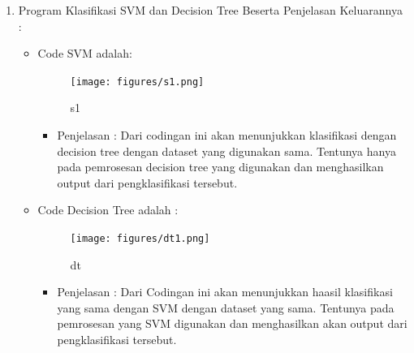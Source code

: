 \begin{enumerate}
\begin{itemize}
\end{itemize}

\par
\par
\item Program Klasifikasi SVM dan Decision Tree Beserta Penjelasan Keluarannya :
\begin{itemize}
\item Code SVM adalah:
\par
\begin{figure}[ht]
\centering
\texttt{[image: figures/s1.png]}
\caption{s1}
\label{contoh}
\end{figure}
\par
\begin{itemize}
\item Penjelasan : Dari codingan ini akan menunjukkan klasifikasi dengan decision tree dengan dataset yang digunakan sama. Tentunya hanya pada pemrosesan decision tree yang digunakan dan menghasilkan output dari pengklasifikasi tersebut.
\par 
\par
\end{itemize}
\item Code Decision Tree adalah :
\par
\begin{figure}[ht]
\centering
\texttt{[image: figures/dt1.png]}
\caption{dt}
\label{contoh}
\end{figure}
\par
\begin{itemize}
\item Penjelasan : Dari Codingan ini akan menunjukkan haasil klasifikasi yang sama  dengan SVM dengan dataset yang sama. Tentunya pada pemrosesan yang SVM digunakan dan menghasilkan akan output dari pengklasifikasi tersebut.
\par
\par
\end{itemize}
\end{itemize}




\end{enumerate}

